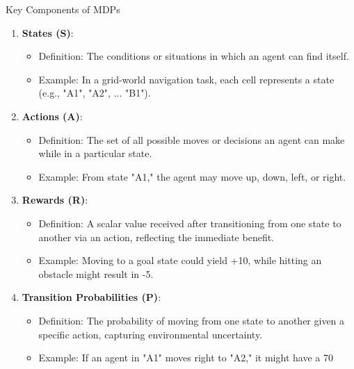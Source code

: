 \documentclass[aspectratio=169]{beamer}
\begin{document}
\begin{frame}[fragile]{Key Components of MDPs}
    \begin{enumerate}
        \item \textbf{States (S)}:
            \begin{itemize}
                \item Definition: The conditions or situations in which an agent can find itself.
                \item Example: In a grid-world navigation task, each cell represents a state (e.g., "A1", "A2", ... "B1").
            \end{itemize}
        
        \item \textbf{Actions (A)}:
            \begin{itemize}
                \item Definition: The set of all possible moves or decisions an agent can make while in a particular state.
                \item Example: From state "A1," the agent may move up, down, left, or right.
            \end{itemize}
        
        \item \textbf{Rewards (R)}:
            \begin{itemize}
                \item Definition: A scalar value received after transitioning from one state to another via an action, reflecting the immediate benefit.
                \item Example: Moving to a goal state could yield +10, while hitting an obstacle might result in -5.
            \end{itemize}
        
        \item \textbf{Transition Probabilities (P)}:
            \begin{itemize}
                \item Definition: The probability of moving from one state to another given a specific action, capturing environmental uncertainty.
                \item Example: If an agent in "A1" moves right to "A2," it might have a 70%
            \end{itemize}
    \end{enumerate}
\end{frame}
\end{document}
